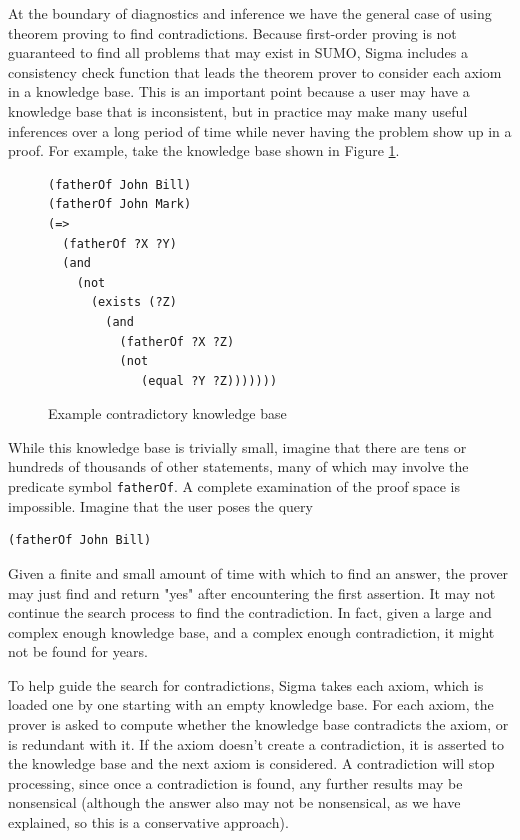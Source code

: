 \documentclass{book}
\begin{document}
At the boundary of diagnostics and inference we have the general case of using
theorem proving to find contradictions.  Because first-order proving is not
guaranteed to find all problems that may exist in SUMO, Sigma includes a
consistency check function that leads the theorem prover to consider each axiom
in a knowledge base. This is an important point because a user may have a
knowledge base that is inconsistent, but in practice may make many useful
inferences over a long period of time while never having the problem show up in
a proof. For example, take the knowledge base shown in Figure \ref{fig:ContKB}.

\begin{figure}
\begin{framed}
\begin{verbatim}
(fatherOf John Bill)
(fatherOf John Mark)
(=>
  (fatherOf ?X ?Y)
  (and
    (not
      (exists (?Z)
        (and
          (fatherOf ?X ?Z)
          (not
             (equal ?Y ?Z)))))))
\end{verbatim}
\caption{Example contradictory knowledge base}
\label{fig:ContKB}
\end{framed}
\end{figure}

While this knowledge base is trivially small, imagine that there are tens or
hundreds of thousands of other statements, many of which may involve the
predicate symbol {\tt fatherOf}.  A complete examination of the proof space is
impossible.  Imagine that the user poses the query

\begin{verbatim}
(fatherOf John Bill)
\end{verbatim}

Given a finite and small amount of time with which to find an answer, the prover
may just find and return "yes" after encountering the first assertion.  It may
not continue the search process to find the contradiction.  In fact, given a
large and complex enough knowledge base, and a complex enough contradiction, it
might not be found for years.

To help guide the search for contradictions, Sigma takes each axiom, which is
loaded one by one starting with an empty knowledge base.  For each axiom, the
prover is asked to compute whether the knowledge base contradicts the axiom, or
is redundant with it.  If the axiom doesn't create a contradiction, it is
asserted to the knowledge base and the next axiom is considered.  A
contradiction will stop processing, since once a contradiction is found, any
further results may be nonsensical (although the answer also may not be
nonsensical, as we have explained, so this is a conservative approach).
\end{document}
